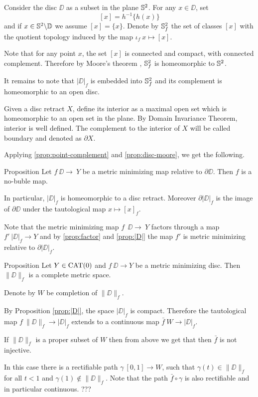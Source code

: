 \documentclass[a4paper,10pt]{amsart}
\begin{document}
Consider the disc $\DD$ as a subset in the plane $\mathbb{S}^2$.
For any $x\in \DD$, set 
\[[x]=h^{-1}\{h(x)\}\]
and
if $x\in \mathbb{S}^2\backslash \mathbb{D}$ we assume $[x]=\{x\}$.
Denote by $\mathbb{S}^2_f$ the set of classes $[x]$ with the quotient topology induced by the map $\iota_f\:x\mapsto [x]$.

Note that for any point $x$, the set $[x]$ is connected and compact, with connected complement.
Therefore by Moore's theorem \cite{moore},
$\mathbb{S}^2_f$ is homeomorphic to $\mathbb{S}^2$.

It remains to note that $|\DD|_f$ is embedded into $\mathbb{S}^2_f$ and its complement is homeomorphic to an open disc.\qeds

Given a disc retract $X$,
define its interior as a maximal open set which is homeomorphic to an open set in the plane.
By Domain Invariance Theorem, interior is well defined.
The complement to the interior of $X$ will be called boundary and denoted as $\partial X$.

Applying \ref{prop:point-complement} and \ref{prop:disc-moore}, we get the following.

\begin{thm}{Proposition}\label{prop:|D|}
Let $f\:\DD\to\ Y$ be a metric minimizing map relative to $\partial \DD$.
Then $f$ is a no-buble map.

In particular,  $|\DD|_f$ is homeomorphic to a disc retract.
Moreover $\partial|\DD|_f$ is the image of $\partial \DD$
under the tautological map $x\mapsto [x]_f$.
\end{thm}

Note that the metric minimizing map $f\:\:\DD\to\ Y$ factors through a map $f'\:|\DD|_f\to Y$
and by \ref{prop:factor} and \ref{prop:|D|} 
the map $f'$
is metric minimizing relative to $\partial|\DD|_f$.

\begin{thm}{Proposition}
Let $Y\in\mathop{\rm CAT}\nolimits(0)$ 
and 
$f\:\DD\to Y$ be a metric minimizing disc.
Then $\|\DD\|_f$ is a complete metric space.
\end{thm}

Denote by $W$ be completion of $\|\DD\|_f$.

By Proposition \ref{prop:|D|},
the space $|\DD|_f$ is compact.
Therefore the tautological map $f\:\|\DD\|_f\to |\DD|_f$ 
extends to a continuous map $\bar f\:W\to |\DD|_f$.

If $\|\DD\|_f$ is a proper subset of $W$ 
then from above we get that
then $\bar f$ is not injective.

In this case there is a rectifiable path $\gamma\:[0,1]\to W$,
such that $\gamma(t)\in\|\DD\|_f$ for all $t<1$ and $\gamma(1)\notin \|\DD\|_f$.
Note that the path $\bar f\circ \gamma$ is also rectifiable and in particular continuous.
???
\qeds
\end{document}
